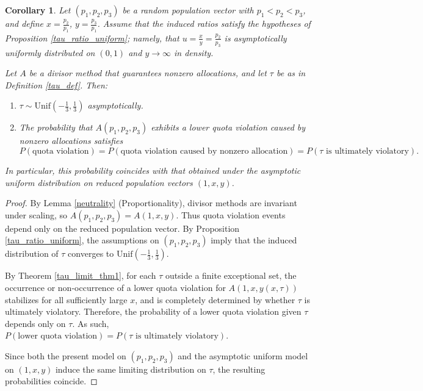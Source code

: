 \documentclass[11pt]{article}
\newtheorem{corollary}{Corollary}[theorem]
\theoremstyle{definition}
\theoremstyle{definition}
\begin{document}
\begin{corollary}\label{prob_lift}
Let $(p_1,p_2,p_3)$ be a random population vector with $p_1 < p_2 < p_3$, and define $x = \frac{p_2}{p_1}$, $y = \frac{p_3}{p_1}$. Assume that the induced ratios satisfy the hypotheses of Proposition \ref{tau_ratio_uniform}; namely, that
$u = \frac{x}{y} = \frac{p_2}{p_3}$ is asymptotically uniformly distributed on $(0,1)$ and $y \to \infty$ in density.

Let $A$ be a divisor method that guarantees nonzero allocations, and let $\tau$ be as in Definition \ref{tau_def}. Then:
\begin{enumerate}
    \item $\tau \sim \mathrm{Unif}\!\left(-\frac{1}{3}, \frac{1}{3}\right)$ asymptotically.
    \item The probability that $A(p_1,p_2,p_3)$ exhibits a lower quota violation caused by nonzero allocations satisfies
    \[
    P(\text{quota violation}) =P(\text{quota violation caused by nonzero allocation})   = P(\tau \text{ is ultimately violatory}).
    \]
\end{enumerate}
In particular, this probability coincides with that obtained under the asymptotic uniform distribution on reduced population vectors $(1,x,y)$.
\end{corollary}

\begin{proof}
By Lemma \ref{neutrality} (Proportionality), divisor methods are invariant under scaling, so
$A(p_1,p_2,p_3) = A(1,x,y).$ Thus quota violation events depend only on the reduced population vector. By Proposition \ref{tau_ratio_uniform}, the assumptions on $(p_1,p_2,p_3)$ imply that the induced distribution of $\tau$ converges to $\mathrm{Unif}\!\left(-\frac{1}{3}, \frac{1}{3}\right)$.

By Theorem \ref{tau_limit_thm1}, for each $\tau$ outside a finite exceptional set, the occurrence or non-occurrence of a lower quota violation for $A(1,x,y(x,\tau))$ stabilizes for all sufficiently large $x$, and is completely determined by whether $\tau$ is ultimately violatory. Therefore, the probability of a lower quota violation given $\tau$ depends only on $\tau$. As such, $P(\text{lower quota violation})= P(\tau \text{ is ultimately violatory}).$

Since both the present model on $(p_1,p_2,p_3)$ and the asymptotic uniform model on $(1,x,y)$ induce the same limiting distribution on $\tau$, the resulting probabilities coincide.
\end{proof}
\end{document}
